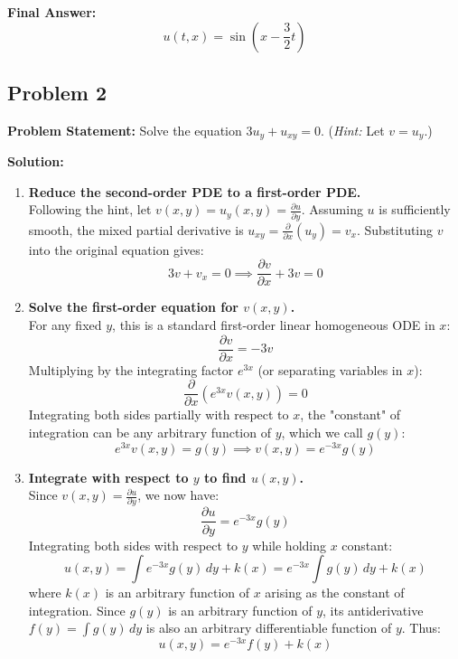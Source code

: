\documentclass[11pt]{article}
\begin{document}
\noindent\textbf{Final Answer:}
\[
\boxed{u(t, x) = \sin\left(x - \frac{3}{2}t\right)}
\]

\hrulefill

\subsection*{Problem 2}
\textbf{Problem Statement:} Solve the equation $3u_y + u_{xy} = 0$. (\emph{Hint:} Let $v = u_y$.)

\textbf{Solution:}
\begin{enumerate}[label=\textbf{Step \arabic*:}]
    \item \textbf{Reduce the second-order PDE to a first-order PDE.} \\
    Following the hint, let $v(x, y) = u_y(x, y) = \frac{\partial u}{\partial y}$. Assuming $u$ is sufficiently smooth, the mixed partial derivative is $u_{xy} = \frac{\partial}{\partial x}(u_y) = v_x$. Substituting $v$ into the original equation gives:
    \[
    3v + v_x = 0 \implies \frac{\partial v}{\partial x} + 3v = 0
    \]

    \item \textbf{Solve the first-order equation for $v(x, y)$.} \\
    For any fixed $y$, this is a standard first-order linear homogeneous ODE in $x$:
    \[
    \frac{\partial v}{\partial x} = -3v
    \]
    Multiplying by the integrating factor $e^{3x}$ (or separating variables in $x$):
    \[
    \frac{\partial}{\partial x}\left(e^{3x}v(x, y)\right) = 0
    \]
    Integrating both sides partially with respect to $x$, the "constant" of integration can be any arbitrary function of $y$, which we call $g(y)$:
    \[
    e^{3x}v(x, y) = g(y) \implies v(x, y) = e^{-3x}g(y)
    \]

    \item \textbf{Integrate with respect to $y$ to find $u(x, y)$.} \\
    Since $v(x, y) = \frac{\partial u}{\partial y}$, we now have:
    \[
    \frac{\partial u}{\partial y} = e^{-3x}g(y)
    \]
    Integrating both sides with respect to $y$ while holding $x$ constant:
    \[
    u(x, y) = \int e^{-3x}g(y)\,dy + k(x) = e^{-3x}\int g(y)\,dy + k(x)
    \]
    where $k(x)$ is an arbitrary function of $x$ arising as the constant of integration. Since $g(y)$ is an arbitrary function of $y$, its antiderivative $f(y) = \int g(y)\,dy$ is also an arbitrary differentiable function of $y$. Thus:
    \[
    u(x, y) = e^{-3x}f(y) + k(x)
    \]
\end{enumerate}
\end{document}
